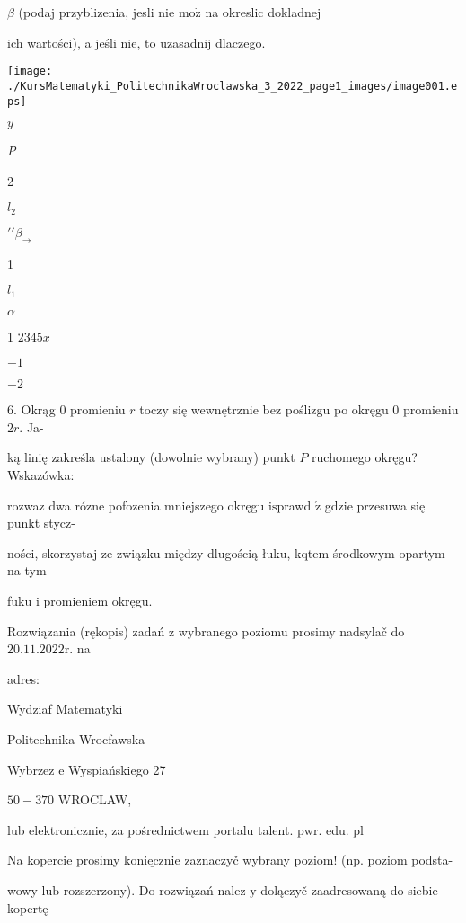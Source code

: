 \documentclass[a4paper,12pt]{article}
\begin{document}
$\beta$ (podaj przyblizenia, jesli nie $\mathrm{m}\mathrm{o}\dot{\mathrm{z}}$ na okreslic dokladnej

ich wartości), a jeśli $\mathrm{n}\mathrm{i}\mathrm{e}$, to uzasadnij dlaczego.
\begin{center}
\texttt{[image: ./KursMatematyki\_PolitechnikaWroclawska\_3\_2022\_page1\_images/image001.eps]}
\end{center}
$y$

{\it P}

2

$l_{2}$

$\prime\prime\beta_{\rightarrow}$

1

$l_{1}$

$\alpha$

1 $2 3 4 5 x$

$-1$

$-2$

6. Okrąg $0$ promieniu $r$ toczy się wewnętrznie bez poślizgu po okręgu $0$ promieniu $2r$. Ja-

ką linię zakreśla ustalony (dowolnie wybrany) punkt $P$ ruchomego okręgu? Wskazówka:

rozwaz dwa rózne pofozenia mniejszego okręgu $\mathrm{i}\mathrm{s}$prawd $\acute{\mathrm{z}}$ gdzie przesuwa się punkt stycz-

ności, skorzystaj ze związku między dlugością łuku, kqtem środkowym opartym na tym

fuku $\mathrm{i}$ promieniem okręgu.

Rozwiązania (rękopis) zadań $\mathrm{z}$ wybranego poziomu prosimy nadsylač do $20.11.2022\mathrm{r}$. na

adres:

Wydziaf Matematyki

Politechnika Wrocfawska

Wybrzez $\mathrm{e}$ Wyspiańskiego 27

$50-370$ WROCLAW,

lub elektronicznie, za pośrednictwem portalu talent. $\mathrm{p}\mathrm{w}\mathrm{r}$. edu. pl

Na kopercie prosimy $\underline{\mathrm{k}\mathrm{o}\mathrm{n}\mathrm{i}\mathrm{e}\mathrm{c}\mathrm{z}\mathrm{n}\mathrm{i}\mathrm{e}}$ zaznaczyč wybrany poziom! (np. poziom podsta-

wowy $\mathrm{l}\mathrm{u}\mathrm{b}$ rozszerzony). Do rozwiązań nalez $\mathrm{y}$ dolączyč zaadresowaną do siebie kopertę
\end{document}
